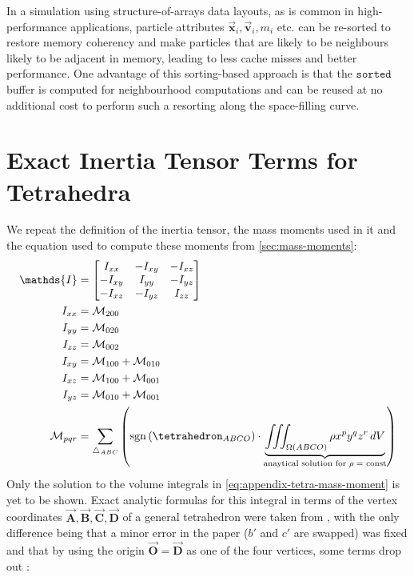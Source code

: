 \documentclass[oneside, a4paper]{book}
\newcommand\vek[1]{\vec{\bm{#1}}}
\newcommand\br[1]{\left(#1\right)}
\DeclareMathOperator{\sgn}{sgn}
\begin{document}
\begin{appendices}
    In a simulation using structure-of-arrays data layouts, as is common in high-performance applications, particle attributes $\vek{x}_i, \vek{v}_i, m_i$ etc. can be re-sorted to restore memory coherency and make particles that are likely to be neighbours likely to be adjacent in memory, leading to less cache misses and better performance. One advantage of this sorting-based approach is that the $\texttt{sorted}$ buffer is computed for neighbourhood computations and can be reused at no additional cost to perform such a resorting along the space-filling curve.

  \chapter{Exact Inertia Tensor Terms for Tetrahedra}\label{chp:analytic-tetrahedron-inertia}
  We repeat the definition of the inertia tensor, the mass moments used in it and the equation used to compute these moments from \autoref{sec:mass-moments}:
  \begin{align}
    \mathds{I} &= \begin{bmatrix}
      I_{xx}&-I_{xy}&-I_{xz}\\
      -I_{xy}&I_{yy}&-I_{yz}\\
      -I_{xz}&-I_{yz}&I_{zz}
    \end{bmatrix}\\
    I_{xx} &= \mathcal{M}_{200}\\
    I_{yy} &= \mathcal{M}_{020}\\
    I_{zz} &= \mathcal{M}_{002}\\
    I_{xy} &= \mathcal{M}_{100} + \mathcal{M}_{010}\\
    I_{xz} &= \mathcal{M}_{100} + \mathcal{M}_{001}\\
    I_{yz} &= \mathcal{M}_{010} + \mathcal{M}_{001}\\
    \mathcal{M}_{pqr} &= \sum_{\triangle_{ABC}} \br{\sgn\br{\tetrahedron_{ABCO}} \cdot \underbrace{\iiint_{\Omega\br{ABCO}} \rho x^p y^q z^r  \,dV}_{\text{anaytical solution for $\rho=$ const}}}\label{eq:appendix-tetra-mass-moment}
  \end{align}
  Only the solution to the volume integrals in \autoref{eq:appendix-tetra-mass-moment} is yet to be shown. Exact analytic formulas for this integral in terms of the vertex coordinates $\vek{A},\vek{B},\vek{C},\vek{D}$ of a general tetrahedron were taken from \autocite[Tonon]{explicit-exact-tetrahedron-formulas}, with the only difference being that a minor error in the paper ($b'$ and $c'$ are swapped) was fixed and that by using the origin $\vek{O} = \vek{D}$ as one of the four vertices, some terms drop out \autocite{explicit-exact-tetrahedron-formulas}:

\end{appendices}
\end{document}
